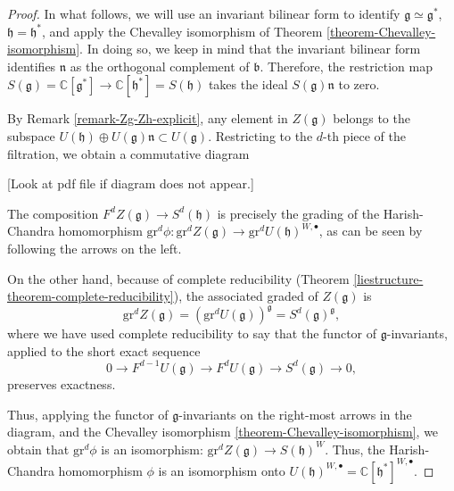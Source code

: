 \begin{proof}
In what follows, we will use an invariant bilinear form to identify $\mathfrak g \simeq \mathfrak g^*$, $\mathfrak h = \mathfrak h^*$, and apply the Chevalley isomorphism of Theorem \ref{theorem-Chevalley-isomorphism}. In doing so, we keep in mind that the invariant bilinear form identifies $\mathfrak n$ as the orthogonal complement of $\mathfrak b$. Therefore, the restriction map $S(\mathfrak g)=\mathbb C[\mathfrak g^*] \to \mathbb C[\mathfrak h^*] = S(\mathfrak h)$ takes the ideal $S(\mathfrak g)\mathfrak n$ to zero.

By Remark \ref{remark-Zg-Zh-explicit}, any element in $Z(\mathfrak g)$ belongs to the subspace $U(\mathfrak h) \oplus U(\mathfrak g)\mathfrak n \subset U(\mathfrak g)$. Restricting to the $d$-th piece of the filtration, we obtain a commutative diagram

[Look at pdf file if diagram does not appear.]

\begin{xy}
\end{xy}

The composition $F^d Z(\mathfrak g) \to S^d(\mathfrak h)$ is precisely the grading of the Harish-Chandra homomorphism $\text{gr}^d \phi: \text{gr}^d Z(\mathfrak g)\to \text{gr}^d U(\mathfrak h)^{W,\bullet}$, as can be seen by following the arrows on the left. 

On the other hand, because of complete reducibility (Theorem \ref{liestructure-theorem-complete-reducibility}), the associated graded of $Z(\mathfrak g)$ is 
$$\text{gr}^d Z(\mathfrak g) = \left(\text{gr}^d U(\mathfrak g)\right)^{\mathfrak g}  = S^d(\mathfrak g)^{\mathfrak g},$$
where we have used complete reducibility to say that the functor of $\mathfrak g$-invariants, applied to the short exact sequence
$$ 0 \to F^{d-1} U(\mathfrak g) \to F^d U(\mathfrak g) \to S^d(\mathfrak g) \to 0,$$
preserves exactness.

Thus, applying the functor of $\mathfrak g$-invariants on the right-most arrows in the diagram, and the Chevalley isomorphism \ref{theorem-Chevalley-isomorphism}, we obtain that $\text{gr}^d \phi$ is an isomorphism: $\text{gr}^d Z(\mathfrak g)\to S(\mathfrak h)^W$. Thus, the Harish-Chandra homomorphism $\phi$ is an isomorphism onto $U(\mathfrak h)^{W,\bullet} = \mathbb C[\mathfrak h^*]^{W,\bullet}$.

\end{proof}







